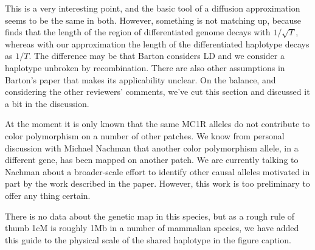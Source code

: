\reply
This is a very interesting point,
and the basic tool of a diffusion approximation seems to be the same in both.
However, something is not matching up,
because \citet{barton1979geneflow} finds that the length of the region of differentiated genome 
decays with $1/\sqrt{T}$,
whereas with our approximation the length of the differentiated haplotype decays as $1/T$.
The difference may be that Barton considers LD and we consider a haplotype unbroken by recombination.
There are also other assumptions in Barton's paper that makes its applicability unclear.
On the balance, and considering the other reviewers' comments,
we've cut this section and discussed it a bit in the discussion. 


\reply
At the moment it is only known that the same MC1R alleles do not
contribute to color polymorphism on a number of other patches. We know
from personal discussion with Michael Nachman that another color
polymorphism allele, in a different gene, has been mapped on another
patch. We are currently talking to Nachman about a broader-scale
effort to identify other causal alleles motivated in part by the work described
in the paper. However, this work is too preliminary to offer any thing
certain.

 There is no data about the genetic map in this species, but
as a rough rule of thumb 1cM is roughly 1Mb in a number of mammalian
species, we have added this guide to the physical scale of the shared haplotype in the figure caption. 


